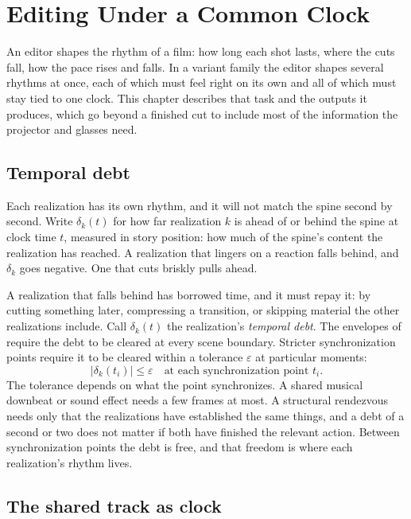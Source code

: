 \chapter{Editing Under a Common Clock}\label{ch:editing}

An editor shapes the rhythm of a film: how long each shot lasts, where the cuts fall, how the pace rises and falls. In a variant family the editor shapes several rhythms at once, each of which must feel right on its own and all of which must stay tied to one clock. This chapter describes that task and the outputs it produces, which go beyond a finished cut to include most of the information the projector and glasses need.

\section{Temporal debt}

Each realization has its own rhythm, and it will not match the spine second by second. Write $\delta_k(t)$ for how far realization $k$ is ahead of or behind the spine at clock time $t$, measured in story position: how much of the spine's content the realization has reached. A realization that lingers on a reaction falls behind, and $\delta_k$ goes negative. One that cuts briskly pulls ahead.

A realization that falls behind has borrowed time, and it must repay it: by cutting something later, compressing a transition, or skipping material the other realizations include. Call $\delta_k(t)$ the realization's \emph{temporal debt}. The envelopes of  require the debt to be cleared at every scene boundary. Stricter synchronization points require it to be cleared within a tolerance $\varepsilon$ at particular moments:
\begin{equation}
|\delta_k(t_i)|\le\varepsilon\quad\text{at each synchronization point } t_i .
\end{equation}
The tolerance depends on what the point synchronizes. A shared musical downbeat or sound effect needs a few frames at most. A structural rendezvous needs only that the realizations have established the same things, and a debt of a second or two does not matter if both have finished the relevant action. Between synchronization points the debt is free, and that freedom is where each realization's rhythm lives.

\section{The shared track as clock}

